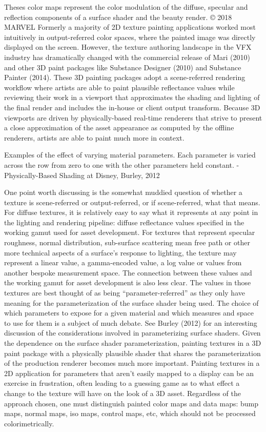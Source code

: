Theses color maps represent the color modulation of the diffuse, specular and reflection components of a surface shader and the beauty render.  
© 2018 MARVEL
Formerly a majority of 2D texture painting applications worked most intuitively in output-referred color spaces, where the painted image was directly displayed on the screen. However, the texture authoring landscape in the VFX industry has dramatically changed with the commercial release of Mari (2010) and other 3D paint packages like Substance Designer (2010) and Substance Painter (2014). These 3D painting packages adopt a scene-referred rendering workflow where artists are able to paint plausible reflectance values while reviewing their work in a viewport that approximates the shading and lighting of the final render and includes the in-house or client output transform. Because 3D viewports are driven by physically-based real-time renderers that strive to present a close approximation of the asset appearance as computed by the offline renderers, artists are able to paint much more in context.

 Examples of the effect of varying material parameters. Each parameter is varied across the row from zero to one with the other parameters held constant. - Physically-Based Shading at Disney, Burley, 2012

One point worth discussing is the somewhat muddied question of whether a texture is scene-referred or output-referred, or if scene-referred, what that means. For diffuse textures, it is relatively easy to say what it represents at any point in the lighting and rendering pipeline: diffuse reflectance values specified in the working gamut used for asset development. For textures that represent specular roughness, normal distribution, sub-surface scattering mean free path or other more technical aspects of a surface’s response to lighting, the texture may represent a linear value, a gamma-encoded value, a log value or values from another bespoke measurement space. The connection between these values and the working gamut for asset development is also less clear. The values in those textures are best thought of as being “parameter-referred” as they only have meaning for the parameterization of the surface shader being used. The choice of which parameters to expose for a given material and which measures and space to use for them is a subject of much debate. See Burley (2012) for an interesting discussion of the considerations involved in parameterizing surface shaders. Given the dependence on the surface shader parameterization, painting textures in a 3D paint package with a physically plausible shader that shares the parameterization of the production renderer becomes much more important. Painting textures in a 2D application for parameters that aren’t easily mapped to a display can be an exercise in frustration, often leading to a guessing game as to what effect a change to the texture will have on the look of a 3D asset. Regardless of the approach chosen, one must distinguish painted color maps and data maps: bump maps, normal maps, iso maps, control maps, etc, which should not be processed colorimetrically.






